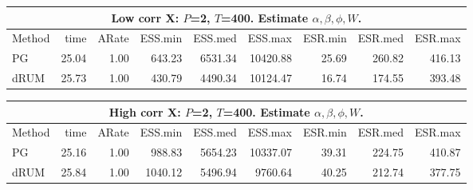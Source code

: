 \documentclass[11pt]{article}
\begin{document}
\begin{table}
\centering
\begin{tabular}{l r r r r r r r r } 
\hline
\multicolumn{9}{c}{Low corr X: $P$=2, $T$=400.  Estimate $\alpha, \beta, \phi, W$.} \\
\hline
          Method  &   time &  ARate & ESS.min & ESS.med & ESS.max & ESR.min & ESR.med & ESR.max \\ 
            PG  &    25.04 &     1.00 &    643.23 &   6531.34 &  10420.88 &     25.69 &    260.82 &    416.13 \\ 
          dRUM  &    25.73 &     1.00 &    430.79 &   4490.34 &  10124.47 &     16.74 &    174.55 &    393.48
 \end{tabular}

\begin{tabular}{l r r r r r r r r } 
\hline
\multicolumn{9}{c}{High corr X: $P$=2, $T$=400. Estimate $\alpha, \beta, \phi, W$.} \\
\hline
          Method  &   time &  ARate & ESS.min & ESS.med & ESS.max & ESR.min & ESR.med & ESR.max \\ 
            PG  &    25.16 &     1.00 &    988.83 &   5654.23 &  10337.07 &     39.31 &    224.75 &    410.87 \\ 
          dRUM  &    25.84 &     1.00 &   1040.12 &   5496.94 &   9760.64 &     40.25 &    212.74 &    377.75
 \end{tabular}
\end{table}



{}

\end{document}
